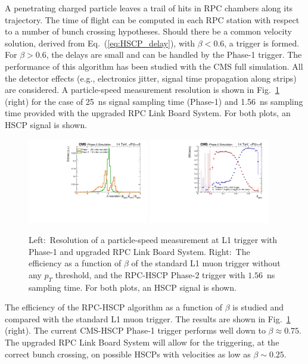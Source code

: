 A penetrating charged particle leaves a trail of hits in RPC chambers along its trajectory. The time of flight can be computed in each RPC station with respect to a number of bunch crossing hypotheses. Should there be a common velocity solution, derived from Eq.~(\ref{eq:HSCP_delay}), with $\beta < 0.6$, a trigger is formed. For $\beta >0.6$, the delays are small and can be handled by the Phase-1 trigger. The performance of this algorithm has been studied with the CMS full simulation. All the detector effects (e.g., electronics jitter, signal time propagation along strips) are considered. A particle-speed measurement resolution is shown in Fig.~\ref{fig:HCP_Trigger} (right) for the case of 25~ns signal sampling time (Phase-1) and 1.56~ns sampling time provided with the upgraded RPC Link Board System. For both plots, an HSCP signal is shown.

\begin{figure}[t]
\begin{center}
  \includegraphics[width=0.47\textwidth]{figures/HSCP/beta_GenRes_2.pdf} \hfill
  \includegraphics[width=0.47\textwidth]{figures/HSCP/trigEff-Mu-HSCPTriggers.pdf}
  \caption{Left:~Resolution of a particle-speed measurement at L1 trigger with Phase-1 and upgraded RPC Link Board System. Right:~The efficiency as a function of $\beta$ of the standard L1 muon trigger without any $p_T$ threshold, and the RPC-HSCP Phase-2 trigger with $1.56$~ns sampling time. For both plots, an HSCP signal is shown.}
  \label{fig:HCP_Trigger}
\end{center}
\end{figure}

The efficiency of the RPC-HSCP algorithm as a function of $\beta$ is studied and compared with the standard L1 muon trigger. The results are shown in Fig.~\ref{fig:HCP_Trigger} (right). The current CMS-HSCP Phase-1 trigger performs well down to $\beta \approx 0.75$. The upgraded RPC Link Board System will allow for the triggering, at the
correct bunch crossing, on possible HSCPs with velocities as low as $\beta \sim 0.25$.

